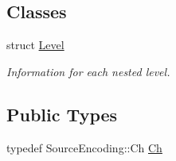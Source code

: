 \subsection*{Classes}
\begin{DoxyCompactItemize}
\item 
struct \hyperlink{structWriter_1_1Level}{Level}
\begin{DoxyCompactList}\small\item\em Information for each nested level. \end{DoxyCompactList}\end{DoxyCompactItemize}
\subsection*{Public Types}
\begin{DoxyCompactItemize}
\item 
typedef Source\+Encoding\+::\+Ch \hyperlink{classWriter_a5ba0d623162839460024b517fc2d5868}{Ch}
\end{DoxyCompactItemize}

